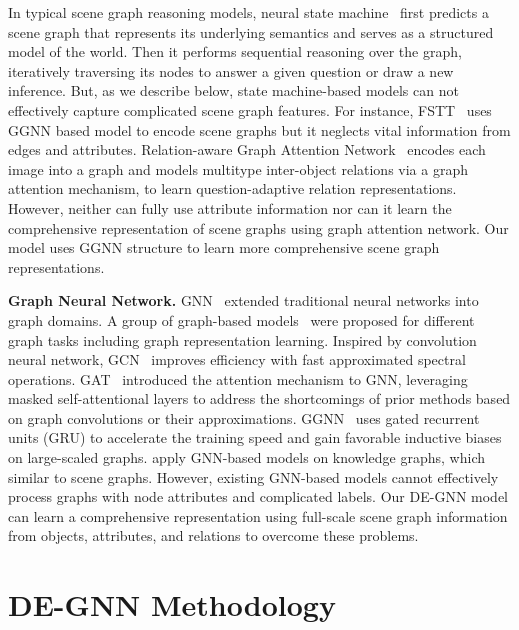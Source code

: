 \documentclass[letterpaper]{article} %
\begin{document}
In typical scene graph reasoning models, neural state machine~\cite{DBLP:conf/nips/HudsonM19} first predicts a scene graph that represents its underlying semantics and serves as a structured model of the world. 
Then it performs sequential reasoning over the graph, iteratively traversing its nodes to answer a given question or draw a new inference. 
But, as we describe below, state machine-based models can not effectively capture complicated scene graph features.
For instance, FSTT~\cite{inproceedings} uses GGNN based model to encode scene graphs but it neglects vital information from edges and attributes. Relation-aware Graph Attention Network~\cite{DBLP:conf/iccv/LiGCL19} encodes each image into a graph and models multitype inter-object relations via a graph attention mechanism, to learn question-adaptive relation representations. However, neither can fully use attribute information nor can it learn the comprehensive representation of scene graphs using graph attention network. 
Our model uses GGNN structure to learn more comprehensive scene graph representations. 

\vspace{0.05in}
\noindent\textbf{Graph Neural Network.}
GNN~\cite{DBLP:journals/tnn/ScarselliGTHM09} extended traditional neural networks into graph domains. A group of graph-based models~\cite{DBLP:conf/aaai/0001RFHLRG19,DBLP:conf/aaai/LiuCLZLSQ19} were proposed for different graph tasks including graph representation learning. Inspired by convolution neural network, GCN~\cite{DBLP:conf/iclr/KipfW17} improves efficiency with fast approximated spectral operations. GAT~\cite{DBLP:conf/iclr/VelickovicCCRLB18} introduced the attention mechanism to GNN, leveraging masked self-attentional layers to address the shortcomings of prior methods based on graph convolutions or their approximations. GGNN~\cite{DBLP:journals/corr/LiTBZ15} uses gated recurrent units (GRU) to accelerate the training speed and gain favorable inductive biases on large-scaled graphs.
\cite{DBLP:conf/cncl/WangGCL16,DBLP:conf/aaai/WangCGL18,DBLP:conf/aistats/SunL19} apply GNN-based models on knowledge graphs, which similar to scene graphs.
However, existing GNN-based models cannot effectively process graphs with node attributes and complicated labels. Our DE-GNN model can learn a comprehensive representation using full-scale scene graph information from objects, attributes, and relations to overcome these problems.

\section{DE-GNN Methodology}
\end{document}
